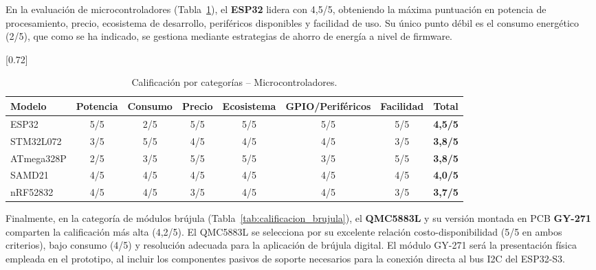 En la evaluación de microcontroladores (Tabla~\ref{tab:calificacion_mcu}), el \textbf{ESP32} lidera con 4,5/5, obteniendo la máxima puntuación en potencia de procesamiento, precio, ecosistema de desarrollo, periféricos disponibles y facilidad de uso. Su único punto débil es el consumo energético (2/5), que como se ha indicado, se gestiona mediante estrategias de ahorro de energía a nivel de firmware.

\begin{table}[H]
\begin{center}
\caption{Calificación por categorías -- Microcontroladores.}
\scalebox{0.72}[0.72]{
\begin{tabular}{| l | c | c | c | c | c | c | c |}
\hline
 \textbf{Modelo} & \textbf{Potencia} & \textbf{Consumo} & \textbf{Precio} & \textbf{Ecosistema} & \textbf{GPIO/Periféricos} & \textbf{Facilidad} & \textbf{Total} \\
\hline
\hline
 ESP32 & 5/5 & 2/5 & 5/5 & 5/5 & 5/5 & 5/5 & \textbf{4,5/5} \\
 STM32L072 & 3/5 & 5/5 & 4/5 & 4/5 & 4/5 & 3/5 & \textbf{3,8/5} \\
 ATmega328P & 2/5 & 3/5 & 5/5 & 5/5 & 3/5 & 5/5 & \textbf{3,8/5} \\
 SAMD21 & 4/5 & 4/5 & 4/5 & 4/5 & 4/5 & 4/5 & \textbf{4,0/5} \\
 nRF52832 & 4/5 & 4/5 & 3/5 & 4/5 & 4/5 & 3/5 & \textbf{3,7/5} \\
\hline
\end{tabular}}
\label{tab:calificacion_mcu}
\end{center}
\end{table}

Finalmente, en la categoría de módulos brújula (Tabla~\ref{tab:calificacion_brujula}), el \textbf{QMC5883L} y su versión montada en PCB \textbf{GY-271} comparten la calificación más alta (4,2/5). El QMC5883L se selecciona por su excelente relación costo-disponibilidad (5/5 en ambos criterios), bajo consumo (4/5) y resolución adecuada para la aplicación de brújula digital. El módulo GY-271 será la presentación física empleada en el prototipo, al incluir los componentes pasivos de soporte necesarios para la conexión directa al bus I2C del ESP32-S3.

